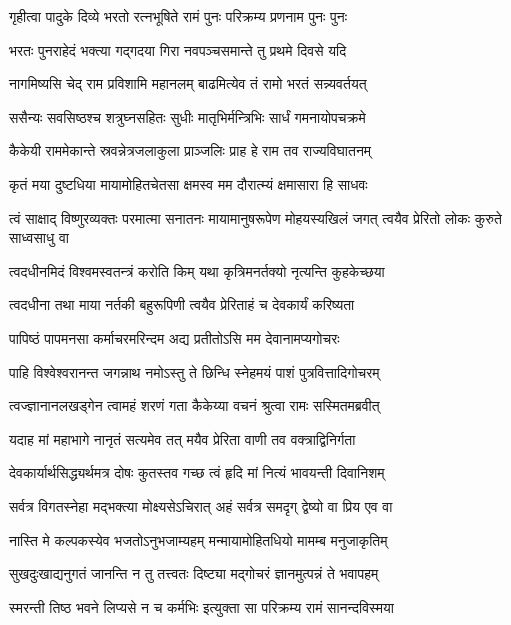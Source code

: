 \twolineshloka
{गृहीत्वा पादुके दिव्ये भरतो रत्नभूषिते}
{रामं पुनः परिक्रम्य प्रणनाम पुनः पुनः} %

\twolineshloka
{भरतः पुनराहेदं भक्त्या गद्गदया गिरा}
{नवपञ्चसमान्ते तु प्रथमे दिवसे यदि} %

\twolineshloka
{नागमिष्यसि चेद् राम प्रविशामि महानलम्}
{बाढमित्येव तं रामो भरतं सन्न्यवर्तयत्} %

\twolineshloka
{ससैन्यः सवसिष्ठश्च शत्रुघ्नसहितः सुधीः}
{मातृभिर्मन्त्रिभिः सार्धं गमनायोपचक्रमे} %

\twolineshloka
{कैकेयी राममेकान्ते स्रवन्नेत्रजलाकुला}
{प्राञ्जलिः प्राह हे राम तव राज्यविघातनम्} %

\twolineshloka
{कृतं मया दुष्टधिया मायामोहितचेतसा}
{क्षमस्व मम दौरात्म्यं क्षमासारा हि साधवः} %

\threelineshloka
{त्वं साक्षाद् विष्णुरव्यक्तः परमात्मा सनातनः}
{मायामानुषरूपेण मोहयस्यखिलं जगत्}
{त्वयैव प्रेरितो लोकः कुरुते साध्वसाधु वा} %

\twolineshloka
{त्वदधीनमिदं विश्वमस्वतन्त्रं करोति किम्}
{यथा कृत्रिमनर्तक्यो नृत्यन्ति कुहकेच्छया} %

\twolineshloka
{त्वदधीना तथा माया नर्तकी बहुरूपिणी}
{त्वयैव प्रेरिताहं च देवकार्यं करिष्यता} %

\twolineshloka
{पापिष्ठं पापमनसा कर्माचरमरिन्दम}
{अद्य प्रतीतोऽसि मम देवानामप्यगोचरः} %

\twolineshloka
{पाहि विश्वेश्वरानन्त जगन्नाथ नमोऽस्तु ते}
{छिन्धि स्नेहमयं पाशं पुत्रवित्तादिगोचरम्} %

\twolineshloka
{त्वज्ज्ञानानलखड्गेन त्वामहं शरणं गता}
{कैकेय्या वचनं श्रुत्वा रामः सस्मितमब्रवीत्} %

\twolineshloka
{यदाह मां महाभागे नानृतं सत्यमेव तत्}
{मयैव प्रेरिता वाणी तव वक्त्राद्विनिर्गता} %

\twolineshloka
{देवकार्यार्थसिद्ध्यर्थमत्र दोषः कुतस्तव}
{गच्छ त्वं हृदि मां नित्यं भावयन्ती दिवानिशम्} %

\twolineshloka
{सर्वत्र विगतस्नेहा मद्भक्त्या मोक्ष्यसेऽचिरात्}
{अहं सर्वत्र समदृग् द्वेष्यो वा प्रिय एव वा} %

\twolineshloka
{नास्ति मे कल्पकस्येव भजतोऽनुभजाम्यहम्}
{मन्मायामोहितधियो मामम्ब मनुजाकृतिम्} %

\twolineshloka
{सुखदुःखाद्यनुगतं जानन्ति न तु तत्त्वतः}
{दिष्ट्या मद्गोचरं ज्ञानमुत्पन्नं ते भवापहम्} %

\twolineshloka
{स्मरन्ती तिष्ठ भवने लिप्यसे न च कर्मभिः}
{इत्युक्ता सा परिक्रम्य रामं सानन्दविस्मया} %

